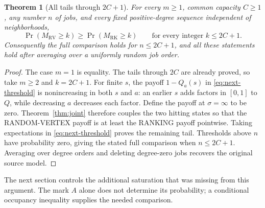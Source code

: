 \documentclass[11pt]{article}
\newtheorem{theorem}{Theorem}
\newcommand{\RV}{\mathrm{RV}}
\newcommand{\RK}{\mathrm{RK}}
\begin{document}
\begin{theorem}[All tails through $2C+1$]\label{thm:2Cplus1}
For every $m\geq1$, common capacity $C\geq1$, any number $n$ of jobs,
and every fixed positive-degree sequence independent of neighborhoods,
\[
 \Pr(M_\RV\geq k)\geq\Pr(M_\RK\geq k)
 \qquad\text{for every integer }k\leq2C+1.
\]
Consequently the full comparison holds for $n\leq2C+1$, and all these
statements hold after averaging over a uniformly random job order.
\end{theorem}
\begin{proof}
The case $m=1$ is equality. The tails through $2C$ are already proved,
so take $m\geq2$ and $k=2C+1$.
For finite $s$, the payoff $1-Q_a(s)$ in \eqref{eq:next-threshold}
is nonincreasing in both $s$ and $a$: an earlier $s$ adds factors in
$[0,1]$ to $Q$, while decreasing $a$ decreases each factor.
Define the payoff at $\sigma=\infty$ to be zero.
Theorem~\ref{thm:joint} therefore couples the two hitting states so that
the RANDOM-VERTEX payoff is at least the RANKING payoff pointwise.
Taking expectations in \eqref{eq:next-threshold} proves the remaining
tail. Thresholds above $n$ have probability zero, giving the stated full
comparison when $n\leq2C+1$. Averaging over degree orders and deleting
degree-zero jobs recovers the original source model.
\end{proof}

The next section controls the additional saturation that was missing
from this argument. The mark $A$ alone does not determine its probability;
a conditional occupancy inequality supplies the needed comparison.
\end{document}
